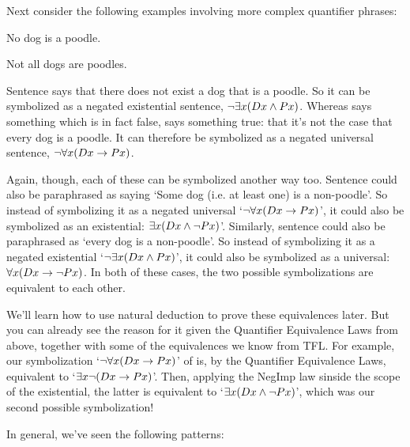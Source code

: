 

Next consider the following examples involving more complex quantifier phrases:

	\begin{earg}
		\item[\ex{q.neg3}] No dog is a poodle.
		\item[\ex{q.neg4}] Not all dogs are poodles.
	\end{earg}
Sentence  says that there does not exist a dog that is a poodle.  So it can be symbolized as a negated existential sentence, $\neg \exists x(Dx \wedge Px)$.  Whereas  says something which is in fact false,  says something true: that it's not the case that every dog is a poodle.  It can therefore be symbolized as a negated universal sentence, $\neg \forall x(Dx \rightarrow Px)$.


Again, though, each of these can be symbolized another way too.  Sentence  could also be paraphrased as saying `Some dog (i.e. at least one) is a non-poodle'.  So instead of symbolizing it as a negated universal `$\neg \forall x(Dx \rightarrow Px)$', it could also be symbolized as an existential: $\exists x(Dx \wedge \neg Px)$'.  Similarly, sentence  could also be paraphrased as `every dog is a non-poodle'.  So instead of symbolizing it as a negated existential `$\neg \exists x(Dx \wedge Px)$', it could also be symbolized as a universal: $\forall x(Dx \rightarrow \neg Px)$.  In both of these cases, the two possible symbolizations are equivalent to each other.

We'll learn how to use natural deduction to prove these equivalences later.  But you can already see the reason for it given the Quantifier Equivalence Laws from above, together with some of the equivalences we know from TFL.  For example, our symbolization `$\neg \forall x(Dx \rightarrow Px)$' of   is, by the Quantifier Equivalence Laws, equivalent to `$\exists x\neg (Dx \rightarrow Px)$'.  Then, applying the NegImp law sinside the scope of the existential, the latter is equivalent to `$\exists x (Dx \wedge \neg Px)$', which was our second possible symbolization!

In general, we've seen the following patterns:

